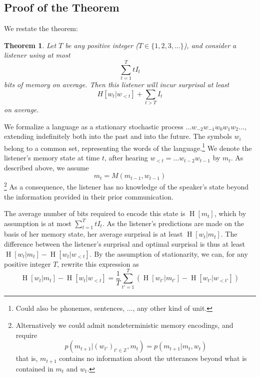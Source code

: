 \documentclass[11pt,letterpaper]{article}
\newcounter{theorem}
\newtheorem{thm}[theorem]{Theorem}
\begin{document}

\subsection{Proof of the Theorem}

We restate the theorem:

\begin{thm}\label{prop:suboptimal}
	Let $T$ be any positive integer ($T \in \{1, 2, 3, ...\}$), and consider a listener using at most
	\begin{equation}\label{eq:memory}
		\sum_{t=1}^T t I_t
	\end{equation}
bits of memory on average.
Then this listener will incur surprisal at least
	$$H[w_t|w_{<t}] + \sum_{t > T} I_t$$
	on average.
\end{thm}



We formalize a language as a stationary stochastic process $\dots w_{-2} w_{-1} w_0 w_{1} w_{2} \dots$, extending indefinitely both into the past and into the future.
The symbols $w_i$ belong to a common set, representing the words of the language.\footnote{Could also be phonemes, sentences, ..., any other kind of unit.}
We denote the listener's memory state at time $t$, after hearing $w_{<t} = ... w_{t-2} w_{t-1}$ by $m_t$.
As described above, we assume
\begin{equation}
	m_t = M(m_{t-1}, w_{t-1})
\end{equation}
\footnote{Alternatively we could admit nondeterministic memory encodings, and require
\begin{equation}\label{eq:listener-markov}
	p(m_{t+1}| (w_{t'})_{t' \in \mathbb{Z}}, m_t)   = p(m_{t+1} | m_t, w_{t})
\end{equation}
that is, $m_{t+1}$ contains no information about the utterances beyond what is contained in $m_t$ and $w_{t}$.}
As a consequence, the listener has no knowledge of the speaker's state beyond the information provided in their prior communication.


The average number of bits required to encode this state is $\operatorname{H}[m_t]$, which by assumption is at most $\sum_{t=1}^T t I_t$.
As the listener's predictions are made on the basis of her memory state, her average surprisal is at least $\operatorname{H}[w_t | m_t]$.
The difference between the listener's surprisal and optimal surprisal is thus at least $\operatorname{H}[w_t | m_t] - \operatorname{H}[w_t | w_{<t}]$.
By the assumption of stationarity, we can, for any positive integer $T$, rewrite this expression as
\begin{equation}\label{eq:byStation}
\operatorname{H}[w_t | m_t] - \operatorname{H}[w_t | w_{<t}] =  \frac{1}{T} \sum_{t'=1}^{T} \left(\operatorname{H}[w_{t'} | m_{t'}] - \operatorname{H}[w_{t'} | w_{<t'}]\right) 
\end{equation}
\end{document}
